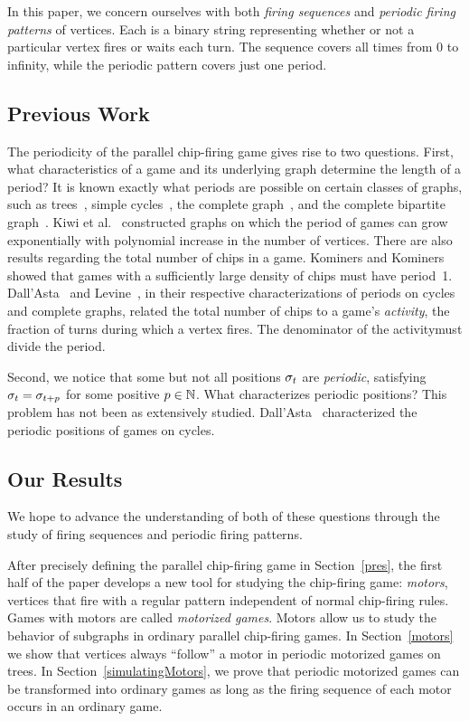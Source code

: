 In this paper, we concern ourselves with both \emph{firing sequences} and
\emph{periodic firing patterns} of vertices. Each is a binary string
representing whether or not a particular vertex fires or waits each turn. The
sequence covers all times from 0 to infinity, while the periodic pattern covers
just one period.

\subsection*{Previous Work}
The periodicity of the parallel chip-firing game gives rise to two
questions. First, what characteristics of a game and its underlying graph
determine the length of a period? It is known exactly what periods are possible
on certain classes of graphs, such as trees~\cite{bitarGoles}, simple
cycles~\cite{cycle}, the complete graph~\cite{levine}, and the complete
bipartite graph~\cite{jiang}. Kiwi et al.~\cite{kiwiEtAl} constructed graphs on
which the period of games can grow exponentially with polynomial increase in
the number of vertices. There are also results regarding the total number of
chips in a game. Kominers and Kominers~\cite{kominers} showed that games with a
sufficiently large density of chips must have period~1. Dall'Asta~\cite{cycle}
and Levine~\cite{levine}, in their respective characterizations of periods on
cycles and complete graphs, related the total number of chips to a game's
\emph{activity}, the fraction of turns during which a vertex fires. The
denominator of the activitymust divide the period.

Second, we notice that some but not all positions $\sigma_{t}$ are
\emph{periodic}, satisfying $\sigma_{t} = \sigma_{t+p}$ for some positive $p \in
\mathbb{N}$. What characterizes periodic positions? This problem has not been as
extensively studied. Dall'Asta~\cite{cycle} characterized the periodic
positions of games on cycles.

\subsection*{Our Results}
We hope to advance the understanding of both of these questions through the
study of firing sequences and periodic firing patterns.

After precisely defining the parallel chip-firing game in Section~\ref{pres},
the first half of the paper develops a new tool for studying the chip-firing
game: \emph{motors}, vertices that fire with a regular pattern independent of
normal chip-firing rules. Games with motors are called \emph{motorized
  games}. Motors allow us to study the behavior of subgraphs in ordinary
parallel chip-firing games. In Section~\ref{motors} we show that vertices
always ``follow'' a motor in periodic motorized games on trees. In
Section~\ref{simulatingMotors}, we prove that periodic motorized games can be
transformed into ordinary games as long as the firing sequence of each motor
occurs in an ordinary game.

